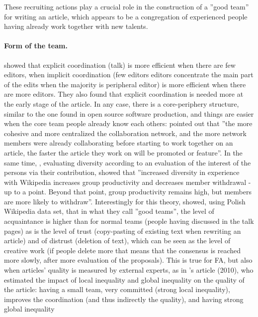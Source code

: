 These recruiting actions play a crucial role in the construction of
a ''good team'' for writing an article, which appears to be a congregation
of experienced people having already work together with new talents.

\paragraph{Form of the team.}

\citet{KitturKraut08} showed that explicit coordination (talk) is
more efficient when there are few editors, when implicit coordination
(few editors editors concentrate the main part of the edits when the
majority is peripheral editor) is more efficient when there are more
editors. They also found that explicit coordination is needed more
at the early stage of the article. In any case, there is a core-periphery
structure, similar to the one found in open source software production,
and things are easier when the core team people already know each
others: \citet{NemotoGloorLaubacher11} pointed out that ''the more
cohesive and more centralized the collaboration network, and the more
network members were already collaborating before starting to work
together on an article, the faster the article they work on will be
promoted or feature''. In the same time, \citet{ChenRenRiedl10},
evaluating diversity according to an evaluation of the interest of
the persons via their contribution, showed that ''increased diversity
in experience with Wikipedia increases group productivity and decreases
member withdrawal - up to a point. Beyond that point, group productivity
remains high, but members are more likely to withdraw''. Interestingly
for this theory, \citet[p. 22]{Tureketal10} showed, using Polish
Wikipedia data set, that in what they call ''good teams'', the level
of acquaintance is higher than for normal teams (people having discussed
in the talk pages) as is the level of trust (copy-pasting of existing
text when rewriting an article) and of distrust (deletion of text),
which can be seen as the level of creative work (if people delete
more that means that the consensus is reached more slowly, after more
evaluation of the proposals). This is true for FA, but also when articles'
quality is measured by external experts, as in \citeauthor{ArazyNov10}'s
article (2010), who estimated the impact of local inequality and global
inequality on the quality of the article: having a small team, very
committed (strong local inequality), improves the coordination (and
thus indirectly the quality), and having strong global inequality
